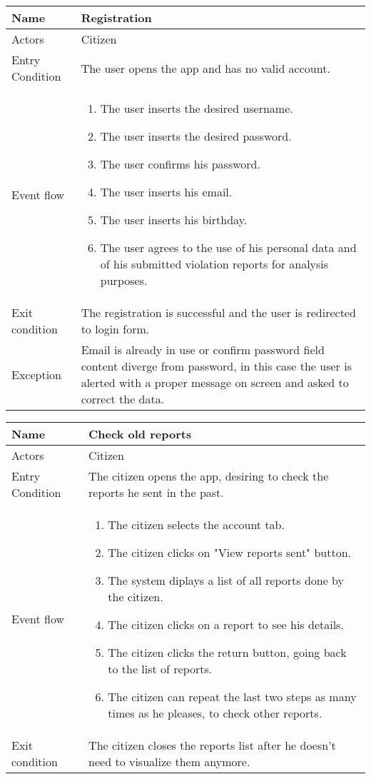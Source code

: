 \vskip 0.2in
\begin{tabular}{|p{3.7cm}|p{11cm}|}
\hline
Name & Registration\\
\hline
Actors & Citizen\\
\hline
Entry Condition & The user opens the app and has no valid account.\\
\hline
Event flow & \begin{enumerate}
                \item The user inserts the desired username.
                \item The user inserts the desired password.
                \item The user confirms his password.
                \item The user inserts his email.
                \item The user inserts his birthday.
                \item The user agrees to the use of his personal data and of his submitted violation reports for analysis purposes.
            \end{enumerate}\\
\hline
Exit condition & The registration is successful and the user is redirected to login form.\\
\hline
Exception & Email is already in use or confirm password field content diverge from password, in this case the user is alerted with a proper message on screen and asked to correct the data.\\
\hline
\end{tabular}

\vskip 0.2in
\begin{tabular}{|p{3.7cm}|p{11cm}|}
	\hline
	Name & Check old reports\\
	\hline
	Actors & Citizen\\
	\hline
	Entry Condition & The citizen opens the app, desiring to check the reports he sent in the past.\\
	\hline
	Event flow & \begin{enumerate}
		\item The citizen selects the account tab.
		\item The citizen clicks on "View reports sent" button.
		\item The system diplays a list of all reports done by the citizen.
		\item The citizen clicks on a report to see his details.
		\item The citizen clicks the return button, going back to the list of reports.
		\item The citizen can repeat the last two steps as many times as he pleases, to check other reports.
	\end{enumerate}\\
	\hline
	Exit condition & The citizen closes the reports list after he doesn't need to visualize them anymore.\\
	\hline
\end{tabular}

